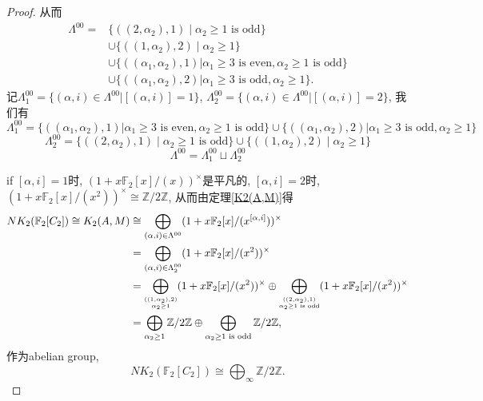 \begin{proof}
从而
\begin{align*}
\Lambda^{00}=&\{((2,\alpha_2),1)\mid  \alpha_2\geq 1\text{ is odd}\} \\
	&\cup \{((1,\alpha_2),2)\mid  \alpha_2\geq 1\} \\
	&\cup \{((\alpha_1,\alpha_2),1) | \alpha_1\geq 3\text{ is even},\alpha_2\geq 1\text{ is odd}\} \\
	&\cup \{((\alpha_1,\alpha_2),2) | \alpha_1\geq 3\text{ is odd},\alpha_2\geq 1\}.
\end{align*}
记$\Lambda^{00}_1=\{(\alpha,i)\in \Lambda^{00}| [(\alpha,i)]=1\}$, $\Lambda^{00}_2=\{(\alpha,i)\in \Lambda^{00}| [(\alpha,i)]=2\}$, 我们有
\[\Lambda^{00}_1= \{((\alpha_1,\alpha_2),1) | \alpha_1\geq 3\text{ is even},\alpha_2\geq 1\text{ is odd}\} \cup \{((\alpha_1,\alpha_2),2) | \alpha_1\geq 3\text{ is odd},\alpha_2\geq 1\}\]
\[\Lambda^{00}_2=\{((2,\alpha_2),1)\mid  \alpha_2\geq 1\text{ is odd}\} \cup \{((1,\alpha_2),2)\mid  \alpha_2\geq 1\}\]
\[\Lambda^{00}=\Lambda^{00}_1 \sqcup \Lambda^{00}_2\]

if $[\alpha,i]=1$时, $(1+x\mathbb{F}_{2}[x]/(x))^{\times}$是平凡的, $[\alpha,i]=2$时, $(1+x\mathbb{F}_{2}[x]/(x^{2}))^{\times}\cong \mathbb{Z}/2 \mathbb{Z}$, 从而由定理\ref{K2(A,M)}得
\begin{align*}
NK_2(\mathbb{F}_2[C_2])\cong K_2(A,M) &\cong \bigoplus_{(\alpha,i)\in\Lambda^{00}}(1+x\mathbb{F}_{2}[x]/(x^{[\alpha,i]}))^{\times}\\
& = \bigoplus_{(\alpha,i)\in \Lambda^{00}_2}(1+x\mathbb{F}_{2}[x]/(x^{2}))^{\times}\\
& = \bigoplus_{\scriptsize\substack{((1,\alpha_2),2) \\ \alpha_2 \geq 1}}(1+x\mathbb{F}_{2}[x]/(x^{2}))^{\times} \oplus \bigoplus_{\scriptsize\substack{((2,\alpha_2),1) \\ \alpha_2\geq 1\text{ is odd}}}(1+x\mathbb{F}_{2}[x]/(x^{2}))^{\times} \\
& = \bigoplus_{\alpha_2 \geq 1}\mathbb{Z}/2 \mathbb{Z} \oplus \bigoplus_{\alpha_2\geq 1\text{ is odd}}\mathbb{Z}/2 \mathbb{Z},
\end{align*}
作为abelian group, 
\[NK_2(\mathbb{F}_2[C_2]) \cong \bigoplus_{\infty} \mathbb{Z}/2 \mathbb{Z}.\]
% 
% 
% 


\end{proof}
